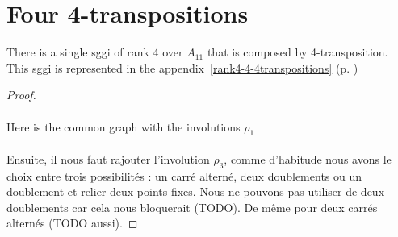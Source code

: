 \section{Four 4-transpositions}

\begin{theorem}
  There is a single sggi of rank 4 over $A_{11}$ that is composed by 4-transposition. This sggi is represented in the appendix~\ref{rank4-4-4transpositions} (p. \pageref{rank4-4-4transpositions})
\end{theorem}

\begin{proof}

  \paragraph{}
  Here is the common graph with the involutions $\rho_1$

  \begin{figure}[H]
    \begin{center}
      \caption{}
    \end{center}
  \end{figure}

  \paragraph{}
  Ensuite, il nous faut rajouter l'involution $\rho_3$, comme d'habitude nous avons le choix entre trois possibilités : un carré alterné, deux doublements ou un doublement et relier deux points fixes. Nous ne pouvons pas utiliser de deux doublements car cela nous bloquerait (TODO). De même pour deux carrés alternés (TODO aussi).


\end{proof}
